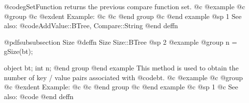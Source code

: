 @code{gSetFunction} returns the previous compare function set.
@c @example
@c @group
@c @exdent Example:
@c 
@c @end group
@c @end example
@sp 1
See also:  @code{AddValue::BTree, Compare::String}
@end deffn






















@pdfsubsubsection {Size}
@deffn {Size} Size::BTree
@sp 2
@example
@group
n = gSize(bt);

object  bt;
int     n;
@end group
@end example
This method is used to obtain the number of key / value pairs associated
with @code{bt}.
@c @example
@c @group
@c @exdent Example:
@c 
@c @end group
@c @end example
@c @sp 1
@c See also:  @code{}
@end deffn




















